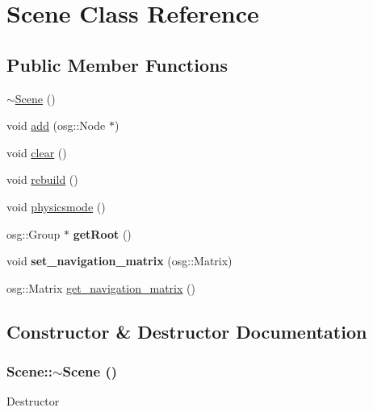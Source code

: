 \hypertarget{class_scene}{
\section{Scene Class Reference}
\label{class_scene}
}
\subsection*{Public Member Functions}
\begin{DoxyCompactItemize}
\item 
\hyperlink{class_scene_a3b8cec2e32546713915f8c6303c951f1}{$\sim$Scene} ()
\item 
void \hyperlink{class_scene_a894ec82f29999e3a24231d64196eb579}{add} (osg::Node $\ast$)
\item 
void \hyperlink{class_scene_a70e5b1218abb729d70d9f41b107017f9}{clear} ()
\item 
void \hyperlink{class_scene_a14255fd5c923aa081dfe4e32db589404}{rebuild} ()
\item 
void \hyperlink{class_scene_a28fba12cc43c64e3216f463984f5ff7f}{physicsmode} ()
\item 
\hypertarget{class_scene_abb3b547f9ca635c617f0dfe64ced8b0b}{
osg::Group $\ast$ {\bfseries getRoot} ()}
\label{class_scene_abb3b547f9ca635c617f0dfe64ced8b0b}

\item 
\hypertarget{class_scene_aa1c94c27c567711b9a9d477c22dba124}{
void {\bfseries set\_\-navigation\_\-matrix} (osg::Matrix)}
\label{class_scene_aa1c94c27c567711b9a9d477c22dba124}

\item 
osg::Matrix \hyperlink{class_scene_ada1eae6ca9a770ef9d3b492403719893}{get\_\-navigation\_\-matrix} ()
\end{DoxyCompactItemize}


\subsection{Constructor \& Destructor Documentation}
\hypertarget{class_scene_a3b8cec2e32546713915f8c6303c951f1}{
\subsubsection[{$\sim$Scene}]{\setlength{\rightskip}{0pt plus 5cm}Scene::$\sim$Scene ()}}
\label{class_scene_a3b8cec2e32546713915f8c6303c951f1}
Destructor 

